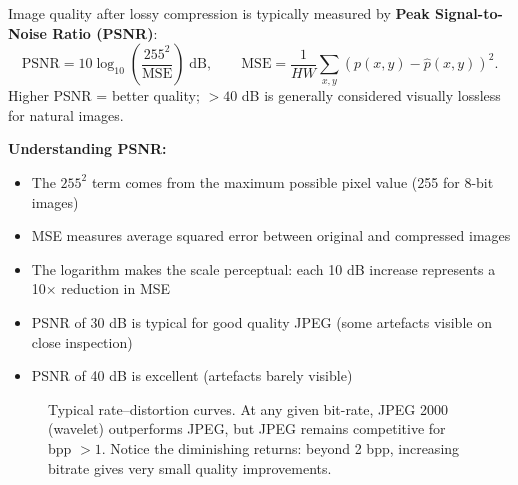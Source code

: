 Image quality after lossy compression is typically measured by \textbf{Peak Signal-to-Noise Ratio (PSNR)}:
\begin{equation}
  \mathrm{PSNR} = 10\log_{10}\!\left(\frac{255^2}{\mathrm{MSE}}\right)\;\text{dB},
  \qquad
  \mathrm{MSE} = \frac{1}{HW}\sum_{x,y}(p(x,y)-\hat{p}(x,y))^2.
\end{equation}
Higher PSNR = better quality; $>40$ dB is generally considered visually lossless for natural images.

\begin{importantbox}
\textbf{Understanding PSNR:}
\begin{itemize}[nosep]
    \item The $255^2$ term comes from the maximum possible pixel value (255 for 8-bit images)
    \item MSE measures average squared error between original and compressed images
    \item The logarithm makes the scale perceptual: each 10 dB increase represents a 10× reduction in MSE
    \item PSNR of 30 dB is typical for good quality JPEG (some artefacts visible on close inspection)
    \item PSNR of 40 dB is excellent (artefacts barely visible)
\end{itemize}
\end{importantbox}

\begin{figure}[H]
\centering
{}
\caption{Typical rate–distortion curves. At any given bit-rate, JPEG 2000 (wavelet) outperforms JPEG, but JPEG remains competitive for bpp $>1$. Notice the diminishing returns: beyond 2 bpp, increasing bitrate gives very small quality improvements.}
\label{fig:rd}
\end{figure}

